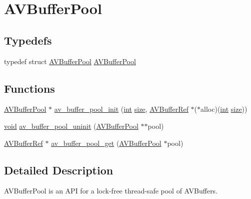 \hypertarget{group__lavu__bufferpool}{}\section{A\+V\+Buffer\+Pool}
\label{group__lavu__bufferpool}
\subsection*{Typedefs}
\begin{DoxyCompactItemize}
\item 
typedef struct \hyperlink{group__lavu__bufferpool_ga13bc8038952b61bae4d591f30c7421f6}{A\+V\+Buffer\+Pool} \hyperlink{group__lavu__bufferpool_ga13bc8038952b61bae4d591f30c7421f6}{A\+V\+Buffer\+Pool}
\end{DoxyCompactItemize}
\subsection*{Functions}
\begin{DoxyCompactItemize}
\item 
\hyperlink{group__lavu__bufferpool_ga13bc8038952b61bae4d591f30c7421f6}{A\+V\+Buffer\+Pool} $\ast$ \hyperlink{group__lavu__bufferpool_ga26af9b07c08bc7fd2cfc62767e490b93}{av\+\_\+buffer\+\_\+pool\+\_\+init} (\hyperlink{xmltok_8h_a5a0d4a5641ce434f1d23533f2b2e6653}{int} \hyperlink{group__lavu__mem_ga854352f53b148adc24983a58a1866d66}{size}, \hyperlink{struct_a_v_buffer_ref}{A\+V\+Buffer\+Ref} $\ast$($\ast$alloc)(\hyperlink{xmltok_8h_a5a0d4a5641ce434f1d23533f2b2e6653}{int} \hyperlink{group__lavu__mem_ga854352f53b148adc24983a58a1866d66}{size}))
\item 
\hyperlink{sound_8c_ae35f5844602719cf66324f4de2a658b3}{void} \hyperlink{group__lavu__bufferpool_ga7b76781c5944b3bb59b2e3b1a8994e4a}{av\+\_\+buffer\+\_\+pool\+\_\+uninit} (\hyperlink{group__lavu__bufferpool_ga13bc8038952b61bae4d591f30c7421f6}{A\+V\+Buffer\+Pool} $\ast$$\ast$pool)
\item 
\hyperlink{struct_a_v_buffer_ref}{A\+V\+Buffer\+Ref} $\ast$ \hyperlink{group__lavu__bufferpool_ga2c745ecb4001452423e775b06b20fb7c}{av\+\_\+buffer\+\_\+pool\+\_\+get} (\hyperlink{group__lavu__bufferpool_ga13bc8038952b61bae4d591f30c7421f6}{A\+V\+Buffer\+Pool} $\ast$pool)
\end{DoxyCompactItemize}


\subsection{Detailed Description}
A\+V\+Buffer\+Pool is an A\+PI for a lock-\/free thread-\/safe pool of A\+V\+Buffers.


